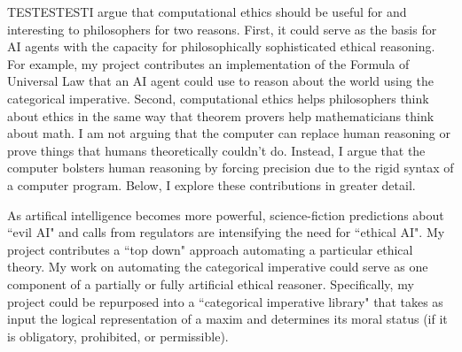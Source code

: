 %
\begin{isabellebody}%
%
%
\isadelimtheory
%
\endisadelimtheory
%
\isatagtheory
%
\endisatagtheory
{\isafoldtheory}%
%
\isadelimtheory
%
\endisadelimtheory
%
\isadelimdocument
%
\endisadelimdocument
%
\isatagdocument
%
\isamarkuptrue%
%
\endisatagdocument
{\isafolddocument}%
%
\isadelimdocument
%
\endisadelimdocument
%
\begin{isamarkuptext}%
TESTESTESTI argue that computational ethics should be useful for and interesting to philosophers for two 
reasons. First, it could serve as the basis for AI agents with the capacity for philosophically sophisticated 
ethical reasoning. For example, my project contributes an implementation of the Formula of Universal Law
that an AI agent could use to reason about the world using the categorical imperative. Second, computational 
ethics helps philosophers think about ethics in the same way that theorem provers help 
mathematicians think about math. I am not arguing that the computer can replace human reasoning or prove things
that humans theoretically couldn't do. Instead, I argue that the computer bolsters human reasoning by forcing precision due to 
the rigid syntax of a computer program. Below, I explore 
these contributions in greater detail.%
\end{isamarkuptext}\isamarkuptrue%
%
\isadelimdocument
%
\endisadelimdocument
%
\isatagdocument
%
\isamarkuptrue%
%
\endisatagdocument
{\isafolddocument}%
%
\isadelimdocument
%
\endisadelimdocument
%
\begin{isamarkuptext}%
As artifical intelligence becomes more powerful, science-fiction predictions about ``evil AI"
and calls from regulators are intensifying the need for ``ethical AI". My project contributes a ``top down" 
approach automating a particular ethical theory. My work on automating the categorical imperative 
could serve as one component of a partially or fully artificial ethical reasoner. Specifically, my 
project could be repurposed into a ``categorical imperative library" that takes as input the logical representation of a maxim 
and determines its moral status (if it is obligatory, prohibited, or permissible).


\end{isamarkuptext}
\end{isabellebody}
